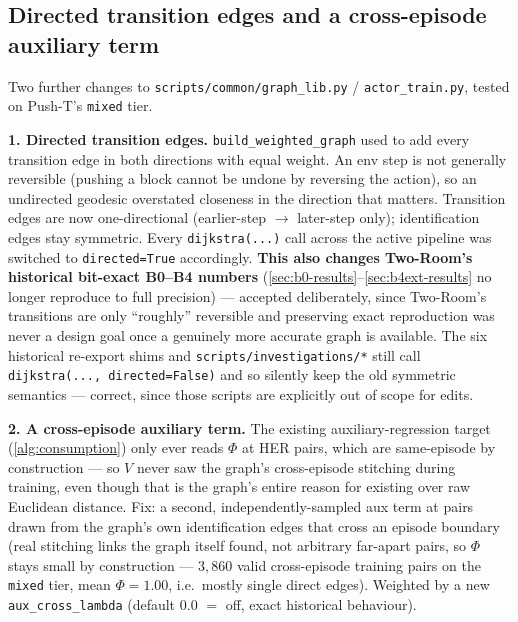 \documentclass[11pt]{article}
\begin{document}
\subsection{Directed transition edges and a cross-episode auxiliary term}
\label{sec:b5-directed-cross-aux}

Two further changes to \texttt{scripts/common/graph\_lib.py} / \texttt{actor\_train.py}, tested
on Push-T's \texttt{mixed} tier.

\textbf{1. Directed transition edges.} \texttt{build\_weighted\_graph} used to add every
transition edge in both directions with equal weight. An env step is not generally reversible
(pushing a block cannot be undone by reversing the action), so an undirected geodesic overstated
closeness in the direction that matters. Transition edges are now one-directional (earlier-step
$\to$ later-step only); identification edges stay symmetric. Every \texttt{dijkstra(...)} call
across the active pipeline was switched to \texttt{directed=True} accordingly. \textbf{This also
changes Two-Room's historical bit-exact B0--B4 numbers} (\cref{sec:b0-results}--\cref{sec:b4ext-results}
no longer reproduce to full precision) --- accepted deliberately, since Two-Room's transitions
are only ``roughly'' reversible and preserving exact reproduction was never a design goal once a
genuinely more accurate graph is available. The six historical re-export shims and
\texttt{scripts/investigations/*} still call \texttt{dijkstra(..., directed=False)} and so
silently keep the old symmetric semantics --- correct, since those scripts are explicitly out of
scope for edits.

\textbf{2. A cross-episode auxiliary term.} The existing auxiliary-regression target
(\cref{alg:consumption}) only ever reads $\Phi$ at HER pairs, which are same-episode by
construction --- so $V$ never saw the graph's cross-episode stitching during training, even
though that is the graph's entire reason for existing over raw Euclidean distance. Fix: a
second, independently-sampled aux term at pairs drawn from the graph's own identification edges
that cross an episode boundary (real stitching links the graph itself found, not arbitrary
far-apart pairs, so $\Phi$ stays small by construction --- $3{,}860$ valid cross-episode training
pairs on the \texttt{mixed} tier, mean $\Phi=1.00$, i.e.\ mostly single direct edges). Weighted
by a new \texttt{aux\_cross\_lambda} (default $0.0$ $=$ off, exact historical behaviour).
\end{document}
